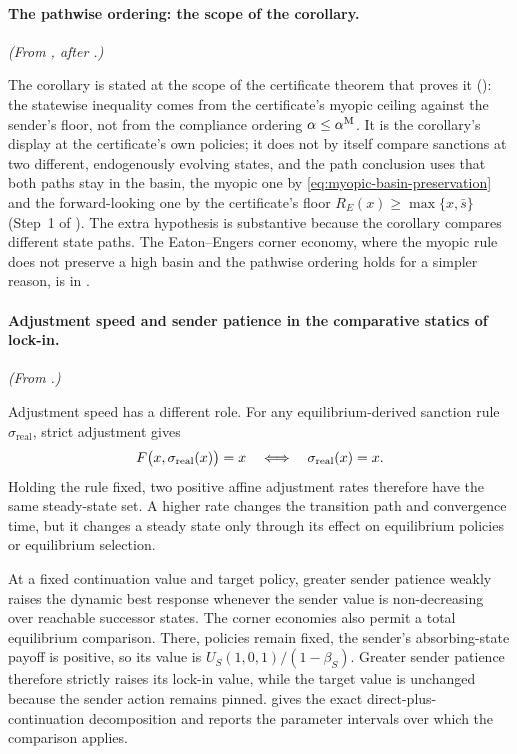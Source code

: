 \paragraph{The pathwise ordering: the scope of the corollary.} \emph{(From , after .)}

The corollary is stated at the scope of the certificate theorem that proves
it (): the statewise inequality comes from the
certificate's myopic ceiling against the sender's floor, not from the
compliance ordering $\alpha\le\alpha^{\mathrm{M}}$. It is the corollary's display at the
certificate's own policies; it does not by itself compare
sanctions at two different, endogenously evolving states, and the path
conclusion uses that both paths stay in the basin, the myopic one by
\eqref{eq:myopic-basin-preservation} and the forward-looking one by the
certificate's floor $R_E(x)\ge\max\{x,\bar s\}$ (Step~1 of ). The extra hypothesis is substantive because the
corollary compares different state paths. The Eaton--Engers corner economy, where the myopic rule does not preserve a
high basin and the pathwise ordering holds for a simpler reason, is in
.

\paragraph{Adjustment speed and sender patience in the comparative statics of lock-in.} \emph{(From .)}

Adjustment speed has a different role. For any equilibrium-derived
sanction rule $\sigma_{\mathrm{real}}$, strict adjustment gives
\[
F\bigl(x,\sigma_{\mathrm{real}}(x)\bigr)=x
\quad\Longleftrightarrow\quad
\sigma_{\mathrm{real}}(x)=x.
\]
Holding the rule fixed, two positive affine adjustment rates therefore
have the same steady-state set. A higher rate changes the transition
path and convergence time, but it changes a steady state only through
its effect on equilibrium policies or equilibrium selection.

At a fixed continuation value and target policy, greater sender patience
weakly raises the dynamic best response whenever the sender value is
non-decreasing over reachable successor states. The corner economies also
permit a total equilibrium comparison. There, policies remain fixed,
the sender's absorbing-state payoff is positive, so its value is
$U_S(1,0,1)/(1-\beta_S)$. Greater sender patience therefore strictly
raises its lock-in value, while the target value is unchanged because
the sender action remains pinned.  gives
the exact direct-plus-continuation decomposition and
 reports the parameter intervals over which
the comparison applies.

